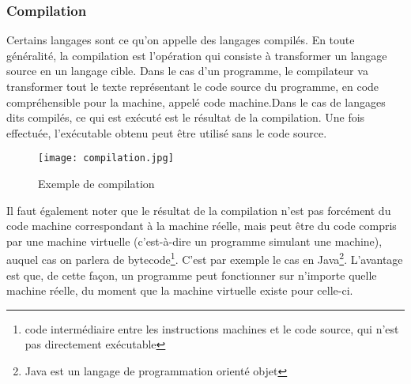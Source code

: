 \documentclass[12pt,a4paper]{article}
\begin{document}
\subsubsection{Compilation}
Certains langages sont ce qu'on appelle des langages compilés\cite{article2}. En
toute généralité, la compilation est l'opération qui consiste à transformer 
un langage source en un langage cible. Dans le cas d'un programme, le 
compilateur va transformer tout le texte représentant le code source du
programme, en code compréhensible pour la machine, appelé code machine.Dans 
le cas de langages dits compilés, ce qui est exécuté est le résultat de la 
compilation. Une fois effectuée, l'exécutable obtenu peut être utilisé sans 
le code source.\\
\newpage
\begin{figure}[ht]
 \centering
  \texttt{[image: compilation.jpg]}
  \caption{Exemple de compilation}
  \label{fig:Exemple de compilation}
\end{figure}
Il faut également noter que le résultat de la compilation n'est pas 
forcément du code machine correspondant à la machine réelle, mais peut 
être du code compris par une machine virtuelle (c'est-à-dire un 
programme simulant une machine), auquel cas on parlera de bytecode\footnote{code
intermédiaire entre les instructions machines et le code source, qui n'est pas 
directement exécutable}. 
C'est par exemple le cas en Java\footnote{Java est un langage de programmation 
orienté objet}. L'avantage est que, de cette façon, 
un programme peut fonctionner sur n'importe quelle machine réelle, du 
moment que la machine virtuelle existe pour celle-ci.\\
\end{document}
